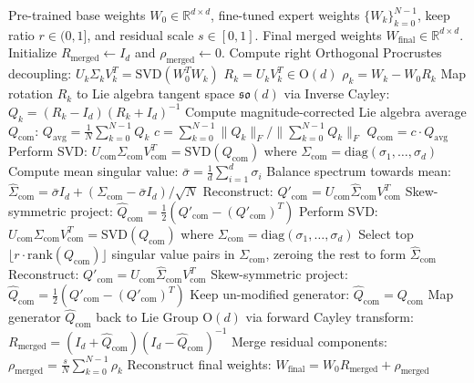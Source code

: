 \begin{algorithm}[tb]
   \caption{RIMO and RIMO-Pruned Model Merging}
   \label{alg:rimo_pruned_algorithm}
\begin{algorithmic}[1]
    Pre-trained base weights $W_0 \in \mathbb{R}^{d \times d}$, fine-tuned expert weights $\{W_k\}_{k=0}^{N-1}$, keep ratio $r \in (0, 1]$, and residual scale $s \in [0, 1]$.
    Final merged weights $W_{\text{final}} \in \mathbb{R}^{d \times d}$.
   \STATE Initialize $R_{\text{merged}} \leftarrow I_d$ and $\rho_{\text{merged}} \leftarrow 0$.
     \STATE Compute right Orthogonal Procrustes decoupling:
     \STATE \quad $U_k \Sigma_k V_k^T = \mathrm{SVD}(W_0^T W_k)$
     \STATE \quad $R_k = U_k V_k^T \in \mathrm{O}(d)$
     \STATE \quad $\rho_k = W_k - W_0 R_k$
     \STATE Map rotation $R_k$ to Lie algebra tangent space $\mathfrak{so}(d)$ via Inverse Cayley:
     \STATE \quad $Q_k = (R_k - I_d)(R_k + I_d)^{-1}$
   \ENDFOR
   \STATE Compute magnitude-corrected Lie algebra average $Q_{\text{com}}$:
   \STATE \quad $Q_{\text{avg}} = \frac{1}{N} \sum_{k=0}^{N-1} Q_k$
   \STATE \quad $c = \sum_{k=0}^{N-1} \|Q_k\|_F / \|\sum_{k=0}^{N-1} Q_k\|_F$
   \STATE \quad $Q_{\text{com}} = c \cdot Q_{\text{avg}}$
     \STATE Perform SVD: $U_{\text{com}} \Sigma_{\text{com}} V_{\text{com}}^T = \mathrm{SVD}(Q_{\text{com}})$ where $\Sigma_{\text{com}} = \text{diag}(\sigma_1, \dots, \sigma_d)$
     \STATE Compute mean singular value: $\bar{\sigma} = \frac{1}{d} \sum_{i=1}^d \sigma_i$
     \STATE Balance spectrum towards mean: $\hat{\Sigma}_{\text{com}} = \bar{\sigma} I_d + (\Sigma_{\text{com}} - \bar{\sigma} I_d) / \sqrt{N}$
     \STATE Reconstruct: $Q'_{\text{com}} = U_{\text{com}} \hat{\Sigma}_{\text{com}} V_{\text{com}}^T$
     \STATE Skew-symmetric project: $\hat{Q}_{\text{com}} = \frac{1}{2}(Q'_{\text{com}} - (Q'_{\text{com}})^T)$
     \STATE Perform SVD: $U_{\text{com}} \Sigma_{\text{com}} V_{\text{com}}^T = \mathrm{SVD}(Q_{\text{com}})$ where $\Sigma_{\text{com}} = \text{diag}(\sigma_1, \dots, \sigma_d)$
     \STATE Select top $\lfloor r \cdot \text{rank}(Q_{\text{com}}) \rfloor$ singular value pairs in $\Sigma_{\text{com}}$, zeroing the rest to form $\hat{\Sigma}_{\text{com}}$
     \STATE Reconstruct: $Q'_{\text{com}} = U_{\text{com}} \hat{\Sigma}_{\text{com}} V_{\text{com}}^T$
     \STATE Skew-symmetric project: $\hat{Q}_{\text{com}} = \frac{1}{2}(Q'_{\text{com}} - (Q'_{\text{com}})^T)$
   \ELSE
     \STATE Keep un-modified generator: $\hat{Q}_{\text{com}} = Q_{\text{com}}$
   \ENDIF
   \STATE Map generator $\hat{Q}_{\text{com}}$ back to Lie Group $\mathrm{O}(d)$ via forward Cayley transform:
   \STATE \quad $R_{\text{merged}} = (I_d + \hat{Q}_{\text{com}})(I_d - \hat{Q}_{\text{com}})^{-1}$
   \STATE Merge residual components: $\rho_{\text{merged}} = \frac{s}{N} \sum_{k=0}^{N-1} \rho_k$
   \STATE Reconstruct final weights: $W_{\text{final}} = W_0 R_{\text{merged}} + \rho_{\text{merged}}$
\end{algorithmic}
\end{algorithm}

